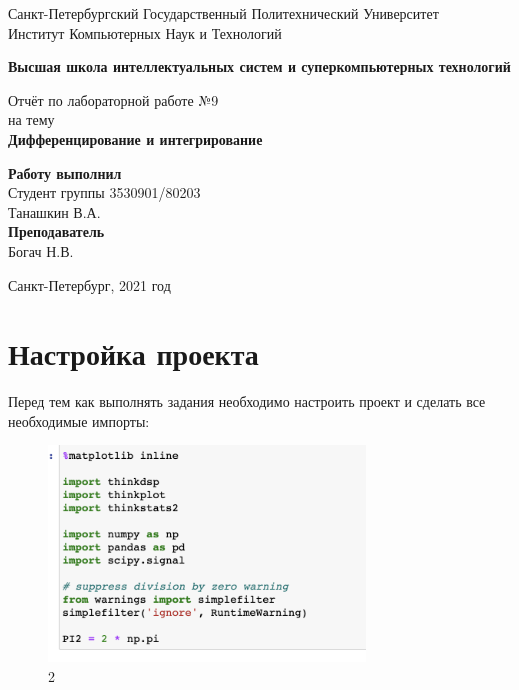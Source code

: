 \documentclass[10pt,a4paper,oneside]{article}
\begin{document}
\begin{titlepage}
\newpage
	\begin{center}
		\Large Санкт-Петербургский Государственный Политехнический Университет\\
		Институт Компьютерных Наук и Технологий\\
	\end{center}
	\begin{center}
		\large\textbf {Высшая школа интеллектуальных систем и суперкомпьютерных технологий}
	\end{center}
	
	\vspace{5em}
	\begin{center}
		\large{Отчёт по лабораторной работе №9 \\ на тему \\
		\textbf{Дифференцирование и интегрирование} }
	\end{center}
	
	\vspace{25em}
	\begin{flushright}
		\textbf{Работу выполнил\\}Студент группы 3530901/80203 \\ Танашкин В.А.\\
		\textbf{Преподаватель\\}Богач Н.В. 
	\end{flushright}
	
	\vspace{\fill}%
	\begin{center}
	Санкт-Петербург, 2021 год	
	\end{center}
\end{titlepage} %

\section{Настройка проекта}
Перед тем как выполнять задания необходимо настроить проект и сделать все необходимые импорты:

\begin{figure}[H]
        \centering
        \includegraphics[width=0.75\textwidth]{pics/0.png}
        \caption{2}
        \label{fig:first}
\end{figure}
\end{document}
